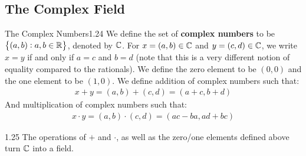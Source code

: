 \subsection{The Complex Field}
\setcounter{rudin}{23}
\begin{definition}{The Complex Numbers}{1.24}
    We define the set of \textbf{complex numbers} to be $\set{(a, b): a, b \in \mathbb{R}}$, denoted by $\mathbb{C}$. For $x = (a, b) \in \mathbb{C}$ and $y = (c, d) \in \mathbb{C}$, we write $x = y$ if and only if $a = c$ and $b = d$ (note that this is a very different notion of equality compared to the rationals). We define the zero element to be $(0, 0)$ and the one element to be $(1, 0)$. We define addition of complex numbers such that:
    \begin{align*}
        x + y = (a, b) + (c, d) = (a + c, b + d)
    \end{align*}
    And multiplication of complex numbers such that:
    \begin{align*}
        x\cdot y = (a, b)\cdot (c, d) = (ac - ba, ad + bc)
    \end{align*}
\end{definition}
\begin{theorem}{}{1.25}
    The operations of $+$ and $\cdot$, as well as the zero/one elements defined above turn $\mathbb{C}$ into a field. 
\end{theorem}

